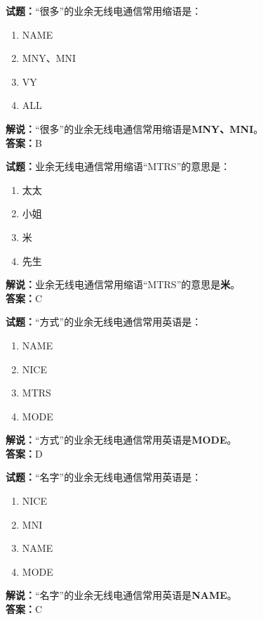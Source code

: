\documentclass{ctexbook}
\begin{document}
\bigskip


\noindent\textbf{试题：}“很多”的业余无线电通信常用缩语是：
\begin{enumerate}[leftmargin=3em]
\item NAME
\item MNY、MNI
\item VY
\item ALL
\end{enumerate}
\noindent\textbf{解说：}“很多”的业余无线电通信常用缩语是\textbf{MNY、MNI}。\\\noindent\textbf{答案：}B



\bigskip


\noindent\textbf{试题：}业余无线电通信常用缩语“MTRS”的意思是：
\begin{enumerate}[leftmargin=3em]
\item 太太
\item 小姐
\item 米
\item 先生
\end{enumerate}
\noindent\textbf{解说：}业余无线电通信常用缩语“MTRS”的意思是\textbf{米}。\\\noindent\textbf{答案：}C



\bigskip


\noindent\textbf{试题：}“方式”的业余无线电通信常用英语是：
\begin{enumerate}[leftmargin=3em]
\item NAME
\item NICE
\item MTRS
\item MODE
\end{enumerate}
\noindent\textbf{解说：}“方式”的业余无线电通信常用英语是\textbf{MODE}。\\\noindent\textbf{答案：}D



\bigskip


\noindent\textbf{试题：}“名字”的业余无线电通信常用英语是：
\begin{enumerate}[leftmargin=3em]
\item NICE
\item MNI
\item NAME
\item MODE
\end{enumerate}
\noindent\textbf{解说：}“名字”的业余无线电通信常用英语是\textbf{NAME}。\\\noindent\textbf{答案：}C
\end{document}
